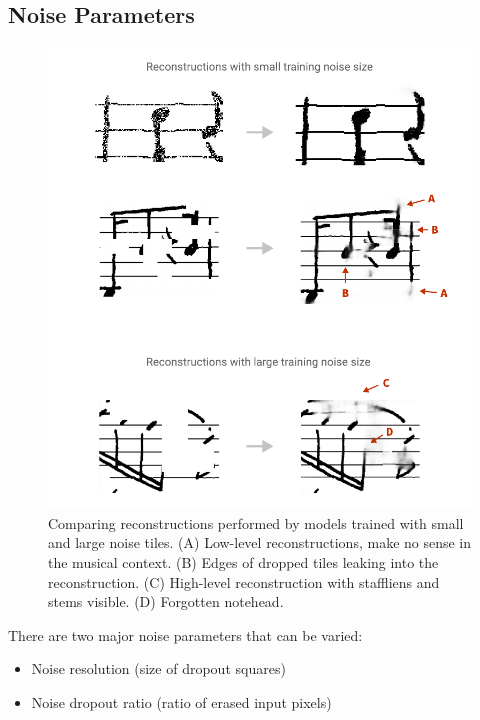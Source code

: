 \subsection{Noise Parameters}
\label{sec:NoiseParameters}

\begin{figure}[p]
    \centering
    \includegraphics[width=145mm]{../../figures/06-noise/noise-size.pdf}
    \caption{Comparing reconstructions performed by models trained with small and large noise tiles. (A) Low-level reconstructions, make no sense in the musical context. (B) Edges of dropped tiles leaking into the reconstruction. (C) High-level reconstruction with staffliens and stems visible. (D) Forgotten notehead.}
    \label{fig:NoiseSize}
\end{figure}

There are two major noise parameters that can be varied:

\begin{itemize}
    \item Noise resolution (size of dropout squares)
    \item Noise dropout ratio (ratio of erased input pixels)
\end{itemize}

